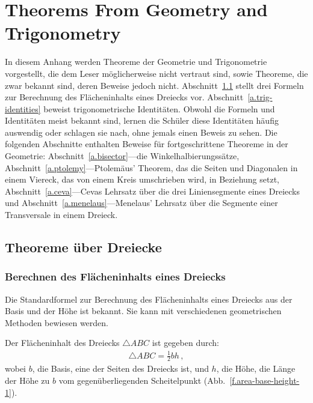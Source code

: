 
\chapter{Theorems From Geometry and Trigonometry}\label{a.trig}


In diesem Anhang werden Theoreme der Geometrie und Trigonometrie vorgestellt, die dem Leser möglicherweise nicht vertraut sind, sowie Theoreme, die zwar bekannt sind, deren Beweise jedoch nicht. Abschnitt~\ref{a.triangles} stellt drei Formeln zur Berechnung des Flächeninhalts eines Dreiecks vor. Abschnitt~\ref{a.trig-identities} beweist trigonometrische Identitäten. Obwohl die Formeln und Identitäten meist bekannt sind, lernen die Schüler diese Identitäten häufig auswendig oder schlagen sie nach, ohne jemals einen Beweis zu sehen. Die folgenden Abschnitte enthalten Beweise für fortgeschrittene Theoreme in der Geometrie: Abschnitt~\ref{a.bisector}---die Winkelhalbierungssätze, Abschnitt~\ref{a.ptolemy}---Ptolemäus' Theorem, das die Seiten und Diagonalen in einem Viereck, das von einem Kreis umschrieben wird, in Beziehung setzt, Abschnitt~\ref{a.ceva}---Cevas Lehrsatz über die drei Liniensegmente eines Dreiecks und Abschnitt~\ref{a.menelaus}---Menelaus' Lehrsatz über die Segmente einer Transversale in einem Dreieck.


\section{Theoreme über Dreiecke}\label{a.triangles}


\subsection{Berechnen des Flächeninhalts eines Dreiecks}

Die Standardformel zur Berechnung des Flächeninhalts eines Dreiecks aus der Basis und der Höhe ist bekannt. Sie kann mit verschiedenen geometrischen Methoden bewiesen werden.

\begin{theorem} Der Flächeninhalt des Dreiecks $\triangle ABC$ ist gegeben durch:
\begin{align}
\triangle ABC=\frac{1}{2}bh\,,\label{eq.area-from-base}
\end{align}
wobei $b$, die Basis, eine der Seiten des Dreiecks ist, und $h$, die Höhe, die Länge der Höhe zu $b$ vom gegenüberliegenden Scheitelpunkt (Abb.~\ref{f.area-base-height-1}).
\end{theorem}

